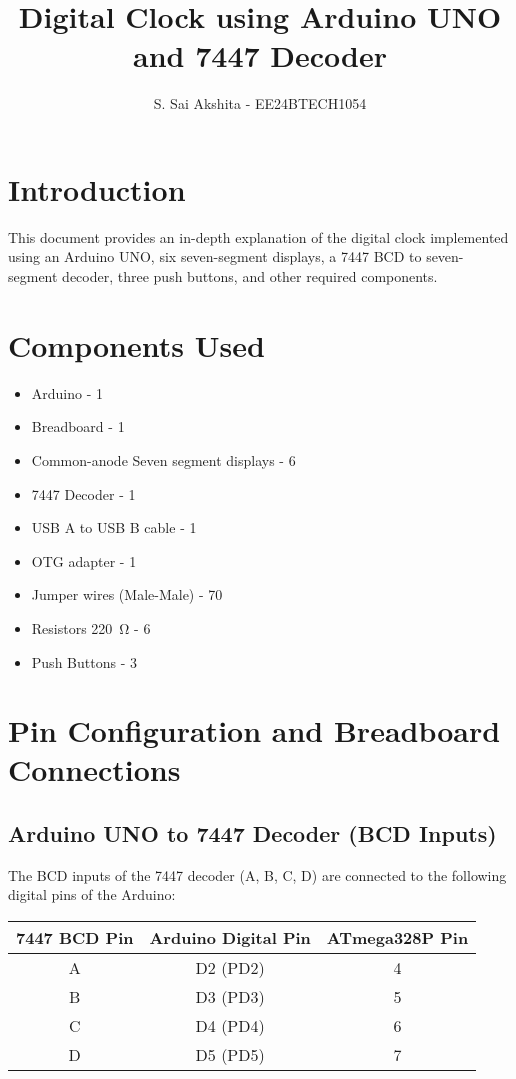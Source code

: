 \documentclass[a4paper,12pt]{article}
\title{Digital Clock using Arduino UNO and 7447 Decoder}
\author{S. Sai Akshita - EE24BTECH1054}
\theoremstyle{remark}
\begin{document}
\maketitle

\renewcommand{\thefigure}{\theenumi}
\renewcommand{\thetable}{\theenumi}



\section{Introduction}
This document provides an in-depth explanation of the digital clock implemented using an Arduino UNO, six seven-segment displays, a 7447 BCD to seven-segment decoder, three push buttons, and other required components.

\section{Components Used}

\begin{itemize}
    \item Arduino - 1  
    \item Breadboard - 1  
    \item Common-anode Seven segment displays - 6  
    \item 7447 Decoder - 1
    \item USB A to USB B cable - 1  
    \item OTG adapter - 1  
    \item Jumper wires (Male-Male) - 70  
    \item Resistors \SI{220}{\ohm} - 6    
    \item Push Buttons - 3  
\end{itemize}

\section{Pin Configuration and Breadboard Connections}

\subsection{Arduino UNO to 7447 Decoder (BCD Inputs)}
The BCD inputs of the 7447 decoder (A, B, C, D) are connected to the following digital pins of the Arduino:
\begin{table}[h]
    \centering
    \begin{tabular}{|c|c|c|}
        \hline
        \textbf{7447 BCD Pin} & \textbf{Arduino Digital Pin} & \textbf{ATmega328P Pin} \\
        \hline
        A  & D2 (PD2)  & 4  \\
        B  & D3 (PD3)  & 5  \\
        C  & D4 (PD4)  & 6  \\
        D  & D5 (PD5)  & 7  \\
        \hline
    \end{tabular}
    \label{tab:bcd_pins}
\end{table}
\end{document}
